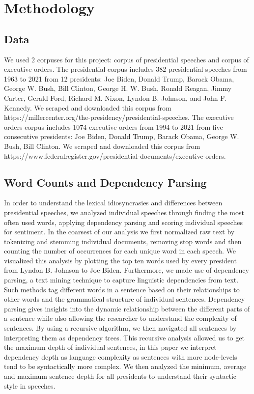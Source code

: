 \documentclass{article}
\begin{document}
\section{Methodology}{
\subsection{Data}{We used 2 corpuses for this project: corpus of presidential speeches and corpus of executive orders. The presidential corpus includes 382 presidential speeches from 1963 to 2021 from 12 presidents: Joe Biden, Donald Trump, Barack Obama, George W. Bush, Bill Clinton, George H. W. Bush, Ronald Reagan, Jimmy Carter, Gerald Ford, Richard M. Nixon, Lyndon B. Johnson, and John F. Kennedy. We scraped and downloaded this corpus from https://millercenter.org/the-presidency/presidential-speeches. The executive orders corpus includes 1074 executive orders from 1994 to 2021 from five consecutive presidents: Joe Biden, Donald Trump, Barack Obama, George W. Bush, Bill Clinton. We scraped and downloaded this corpus from https://www.federalregister.gov/presidential-documents/executive-orders.}
\subsection{Word Counts and Dependency Parsing }{In order to understand the lexical idiosyncrasies and differences between presidential speeches, we analyzed individual speeches through finding the most often used words, applying dependency parsing and scoring individual speeches for sentiment. In the coarsest of our analysis we first normalized raw text by tokenizing and stemming individual documents, removing stop words and then counting the number of occurrences for each unique word in each speech. We visualized this analysis by plotting the top ten words used by every president from Lyndon B. Johnson to Joe Biden. Furthermore, we made use of dependency parsing, a text mining technique to capture linguistic dependencies from text. Such methods tag different words in a sentence based on their relationships to other words and the grammatical structure of individual sentences. Dependency parsing gives insights into the dynamic relationship between the different parts of a sentence while also allowing the researcher to understand the complexity of sentences. By using a recursive algorithm, we then navigated all sentences by interpreting them as dependency trees. This recursive analysis allowed us to get the maximum depth of individual sentences, in this paper we interpret dependency depth as language complexity as sentences with more node-levels tend to be syntactically more complex. We then analyzed the minimum, average and maximum sentence depth for all presidents to understand their syntactic style in speeches. 
}

}
\end{document}
